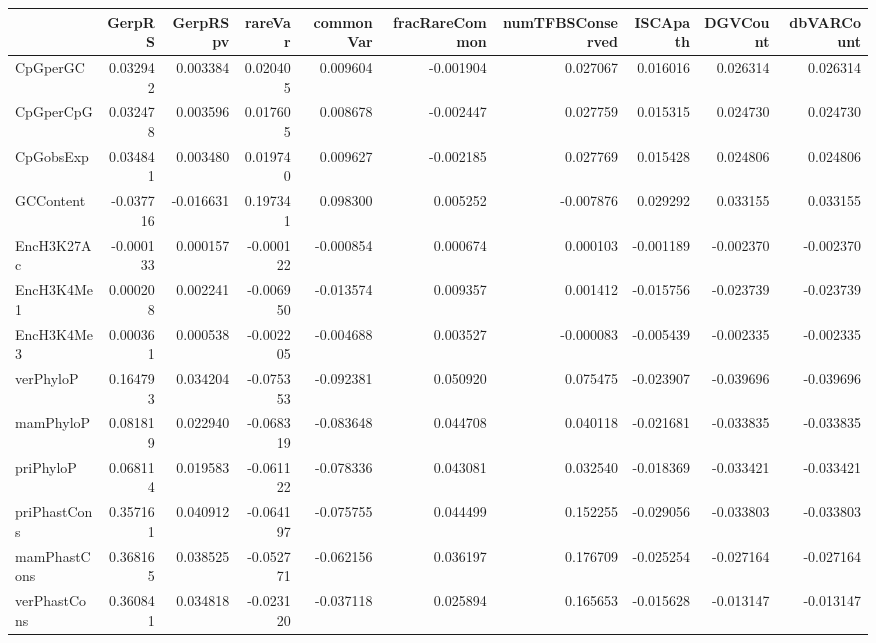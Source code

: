 \begin{tabular}{lrrrrrrrrr}
\toprule
{} &    GerpRS &  GerpRSpv &   rareVar &  commonVar &  fracRareCommon &  numTFBSConserved &  ISCApath &  DGVCount &  dbVARCount \\
\midrule
CpGperGC            &  0.032942 &  0.003384 &  0.020405 &   0.009604 &       -0.001904 &          0.027067 &  0.016016 &  0.026314 &    0.026314 \\
CpGperCpG           &  0.032478 &  0.003596 &  0.017605 &   0.008678 &       -0.002447 &          0.027759 &  0.015315 &  0.024730 &    0.024730 \\
CpGobsExp           &  0.034841 &  0.003480 &  0.019740 &   0.009627 &       -0.002185 &          0.027769 &  0.015428 &  0.024806 &    0.024806 \\
GCContent           & -0.037716 & -0.016631 &  0.197341 &   0.098300 &        0.005252 &         -0.007876 &  0.029292 &  0.033155 &    0.033155 \\
EncH3K27Ac          & -0.000133 &  0.000157 & -0.000122 &  -0.000854 &        0.000674 &          0.000103 & -0.001189 & -0.002370 &   -0.002370 \\
EncH3K4Me1          &  0.000208 &  0.002241 & -0.006950 &  -0.013574 &        0.009357 &          0.001412 & -0.015756 & -0.023739 &   -0.023739 \\
EncH3K4Me3          &  0.000361 &  0.000538 & -0.002205 &  -0.004688 &        0.003527 &         -0.000083 & -0.005439 & -0.002335 &   -0.002335 \\
verPhyloP           &  0.164793 &  0.034204 & -0.075353 &  -0.092381 &        0.050920 &          0.075475 & -0.023907 & -0.039696 &   -0.039696 \\
mamPhyloP           &  0.081819 &  0.022940 & -0.068319 &  -0.083648 &        0.044708 &          0.040118 & -0.021681 & -0.033835 &   -0.033835 \\
priPhyloP           &  0.068114 &  0.019583 & -0.061122 &  -0.078336 &        0.043081 &          0.032540 & -0.018369 & -0.033421 &   -0.033421 \\
priPhastCons        &  0.357161 &  0.040912 & -0.064197 &  -0.075755 &        0.044499 &          0.152255 & -0.029056 & -0.033803 &   -0.033803 \\
mamPhastCons        &  0.368165 &  0.038525 & -0.052771 &  -0.062156 &        0.036197 &          0.176709 & -0.025254 & -0.027164 &   -0.027164 \\
verPhastCons        &  0.360841 &  0.034818 & -0.023120 &  -0.037118 &        0.025894 &          0.165653 & -0.015628 & -0.013147 &   -0.013147 \\

\end{tabular}
